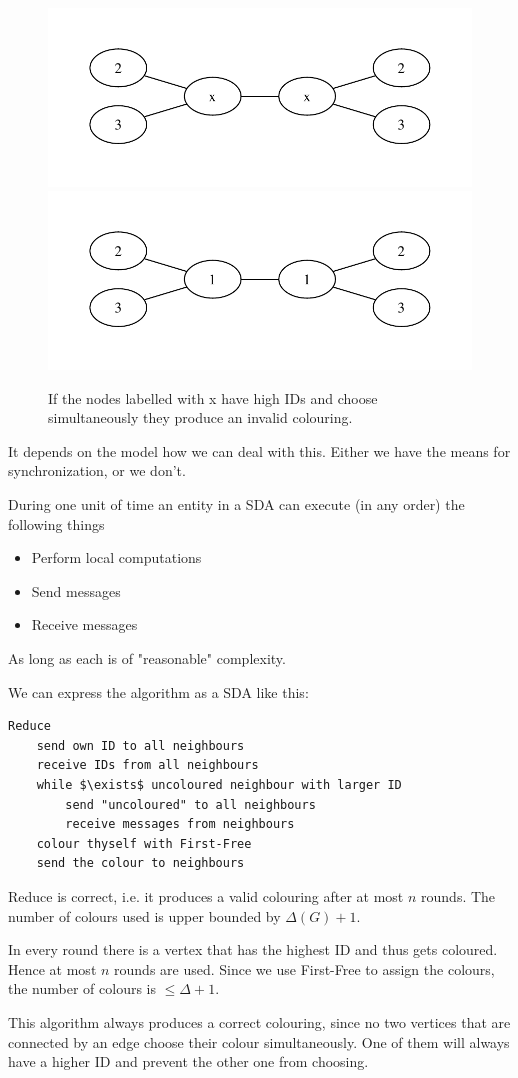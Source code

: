 \begin{figure}
\includegraphics[width=0.5\linewidth]{./images/graph1}
\includegraphics[width=0.5\linewidth]{./images/graph11}
\caption{If the nodes labelled with x have high IDs and choose simultaneously they produce an invalid colouring.}
%
\label{fig:first-free-error}
\end{figure}

It depends on the model how we can deal with this. Either we have the means for synchronization, or we don't.

\begin{Def} During one unit of time an entity in a SDA can execute (in any order) the following things
\begin{itemize}
\item Perform local computations
\item Send messages
\item Receive messages
\end{itemize}

As long as each is of "reasonable" complexity.
\end{Def}

We can express the algorithm as a SDA like this:

\begin{lstlisting}
Reduce
	send own ID to all neighbours
	receive IDs from all neighbours
	while $\exists$ uncoloured neighbour with larger ID
		send "uncoloured" to all neighbours
		receive messages from neighbours
	colour thyself with First-Free
	send the colour to neighbours
\end{lstlisting}

\begin{thm} Reduce is correct, i.e. it produces a valid colouring after at most $n$ rounds. The number of colours used is upper bounded by $\Delta(G)+1$. 
\end{thm}

\begin{pr} In every round there is a vertex that has the highest ID and thus gets coloured. Hence at most $n$ rounds are used. Since we use First-Free to assign the colours, the number of colours is $\leq \Delta+1$.

This algorithm always produces a correct colouring, since no two vertices that are connected by an edge choose their colour simultaneously. One of them will always have a higher ID and prevent the other one from choosing.
\end{pr}
